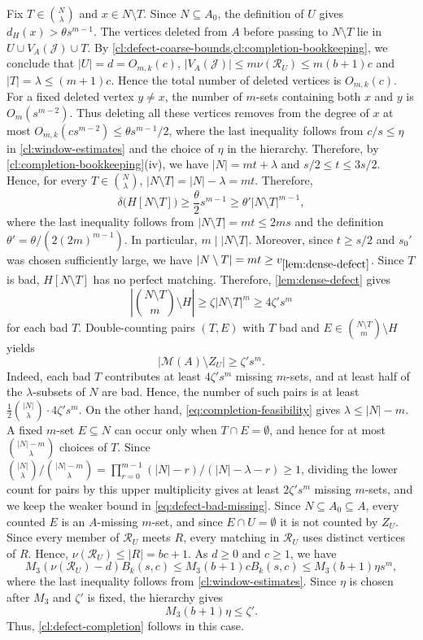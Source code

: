 \documentclass[10pt,a4paper]{article}
\numberwithin{equation}{section}
\theoremstyle{definition}
\newcommand{\M}{\mathcal M}
\newcommand{\Rcal}{\mathcal R}
\begin{document}
Fix $T\in\binom N\lambda$ and $x\in N\setminus T$.
Since $N\subseteq A_0$, the definition of $U$ gives $d_H(x)>\theta s^{m-1}$.
The vertices deleted from $A$ before passing to $N\setminus T$
lie in $U\cup V_A(\mathcal J)\cup T$.
By \cref{cl:defect-coarse-bounds,cl:completion-bookkeeping}, we conclude that $|U|=d=O_{m,k}(c)$, $|V_A(\mathcal J)|\le m\nu(\Rcal_U)\le m(b+1)c$ and $|T|=\lambda\le(m+1)c$.
Hence the total number of deleted vertices is $O_{m,k}(c)$.
For a fixed deleted vertex $y\ne x$, the number of $m$-sets containing
both $x$ and $y$ is $O_m(s^{m-2})$.  Thus deleting all these vertices
removes from the degree of $x$ at most $O_{m,k}(cs^{m-2})
        \le{\theta}s^{m-1}/2$,
where the last inequality follows from $c/s\le\eta$ in
\cref{cl:window-estimates} and the choice of $\eta$ in the hierarchy.
Therefore, by \cref{cl:completion-bookkeeping}(iv), we have $|N| = mt+\lambda$ and $s/2\le t\le 3s/2$.
Hence, for every $T\in\binom{N}{\lambda}$, $|N\setminus T|
        = |N|-\lambda
        = mt$.
Therefore,
\[
        \delta\bigl(H[N\setminus T]\bigr)
        \ge \frac{\theta}{2}s^{m-1}
        \ge \theta'|N\setminus T|^{m-1},
\]
where the last inequality follows from $|N\setminus T|=mt\le 2ms$ and the definition $\theta'=\theta/(2(2m)^{m-1})$.
In particular, $m\mid |N\setminus T|$. Moreover, since
$t\ge s/2$ and $s_0'$ was chosen sufficiently large, we have $|N\setminus T|=mt\ge v_{\ref{lem:dense-defect}}$.
Since $T$ is bad, $H[N\setminus T]$ has no perfect matching.
Therefore, \cref{lem:dense-defect} gives
\[
        \left|\binom{N\setminus T}m\setminus H\right|
        \ge \zeta|N\setminus T|^m
        \ge 4\zeta's^m
\]
for each bad $T$.
Double-counting pairs $(T,E)$ with $T$ bad and $E\in\binom{N\setminus T}m\setminus H$ yields
\begin{equation}\label{eq:defect-bad-missing}
        |\M(A)\setminus Z_U|\ge \zeta's^m.
\end{equation}
Indeed, each bad $T$ contributes at least $4\zeta's^m$ missing $m$-sets, and at least half of the $\lambda$-subsets of $N$ are bad.
Hence, the number of such pairs is at least $\frac12\binom{|N|}{\lambda}\cdot 4\zeta's^m$.
On the other hand, \eqref{eq:completion-feasibility} gives $\lambda\le |N|-m$.
A fixed $m$-set $E\subseteq N$ can occur only when $T\cap E=\emptyset$, and hence for at most $\binom{|N|-m}{\lambda}$ choices of $T$.
Since $\binom{|N|}{\lambda}/\binom{|N|-m}{\lambda}=\prod_{r=0}^{m-1}(|N|-r)/(|N|-\lambda-r)\ge1$, dividing the lower count for pairs by this upper multiplicity gives at least $2\zeta's^m$ missing $m$-sets, and we keep the weaker bound in \eqref{eq:defect-bad-missing}.
Since $N\subseteq A_0\subseteq A$, every counted $E$ is an $A$-missing $m$-set, and since $E\cap U=\emptyset$ it is not counted by $Z_U$.
Since every member of $\Rcal_U$ meets $R$, every matching in $\Rcal_U$ uses distinct vertices of $R$.
Hence, $\nu(\Rcal_U)\le |R|=bc+1$.
As $d\ge0$ and $c\ge1$, we have
\[
        M_3(\nu(\Rcal_U)-d)B_k(s,c)
        \le M_3(b+1)cB_k(s,c)
        \le M_3(b+1)\eta s^m,
\]
where the last inequality follows from \cref{cl:window-estimates}.
Since $\eta$ is chosen after $M_3$ and $\zeta'$ is fixed, the
hierarchy gives
\[
        M_3(b+1)\eta\le\zeta'.
\]
Thus, \cref{cl:defect-completion} follows in this case.
\end{document}
